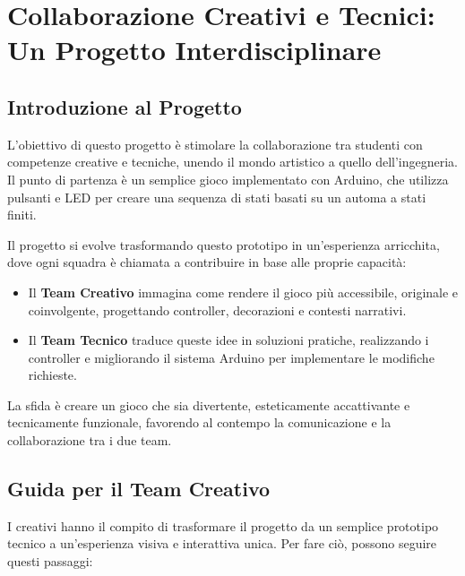 \documentclass[a4paper,12pt]{report}
\begin{document}

\chapter{Collaborazione Creativi e Tecnici: Un Progetto Interdisciplinare}

\section{Introduzione al Progetto}
L'obiettivo di questo progetto \`e stimolare la collaborazione tra studenti con competenze creative e tecniche, unendo il mondo artistico a quello dell'ingegneria. Il punto di partenza \`e un semplice gioco implementato con Arduino, che utilizza pulsanti e LED per creare una sequenza di stati basati su un automa a stati finiti. 

Il progetto si evolve trasformando questo prototipo in un'esperienza arricchita, dove ogni squadra \`e chiamata a contribuire in base alle proprie capacit\`a:
\begin{itemize}
    \item Il \textbf{Team Creativo} immagina come rendere il gioco pi\`u accessibile, originale e coinvolgente, progettando controller, decorazioni e contesti narrativi.
    \item Il \textbf{Team Tecnico} traduce queste idee in soluzioni pratiche, realizzando i controller e migliorando il sistema Arduino per implementare le modifiche richieste.
\end{itemize}

La sfida \`e creare un gioco che sia divertente, esteticamente accattivante e tecnicamente funzionale, favorendo al contempo la comunicazione e la collaborazione tra i due team.

\section{Guida per il Team Creativo}
I creativi hanno il compito di trasformare il progetto da un semplice prototipo tecnico a un'esperienza visiva e interattiva unica. Per fare ci\`o, possono seguire questi passaggi:
\end{document}
